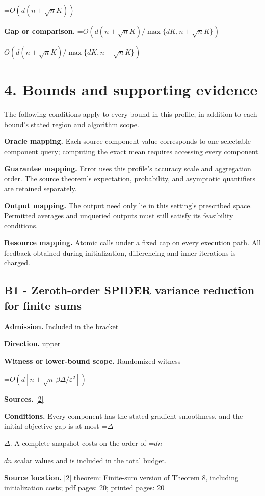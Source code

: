 \documentclass[10pt,a4paper]{article}
\newcommand{\AtlasMath}[1]{\par\begingroup\centering\setbox0=\hbox{$\displaystyle #1$}\ifdim\wd0>1.4\linewidth\typeout{ATLAS WIDE FORMULA: \the\wd0}\fi\ifdim\wd0>\linewidth\resizebox{\linewidth}{!}{\box0}\else\box0\fi\par\endgroup}
\newcommand{\AtlasInlineMath}[1]{\begingroup\setbox0=\hbox{$#1$}\ifdim\wd0>.4\linewidth\endgroup\AtlasMath{#1}\else\endgroup$#1$\fi}
\begin{document}
\AtlasMath{O(d(n+\sqrt n K))}
\textbf{Gap or comparison.} \AtlasInlineMath{O(d(n+\sqrt nK)/\max\{dK,n+\sqrt nK\})}

\section{4. Bounds and supporting evidence}
The following conditions apply to every bound in this profile, in addition to each bound's stated region and algorithm scope.

\textbf{Oracle mapping.} Each source component value corresponds to one selectable component query; computing the exact mean requires accessing every component.

\textbf{Guarantee mapping.} Error uses this profile's accuracy scale and aggregation order. The source theorem's expectation, probability, and asymptotic quantifiers are retained separately.

\textbf{Output mapping.} The output need only lie in this setting's prescribed space. Permitted averages and unqueried outputs must still satisfy its feasibility conditions.

\textbf{Resource mapping.} Atomic calls under a fixed cap on every execution path. All feedback obtained during initialization, differencing and inner iterations is charged.

\subsection{B1 - Zeroth-order SPIDER variance reduction for finite sums}
\textbf{Admission.} Included in the bracket

\textbf{Direction.} upper

\textbf{Witness or lower-bound scope.} Randomized witness

\AtlasMath{O\!\left(d[n+\sqrt n\,\beta \Delta/\varepsilon^2]\right)}
\textbf{Sources.} \href{https://arxiv.org/pdf/1807.01695}{[2]}

\textbf{Conditions.} Every component has the stated gradient smoothness, and the initial objective gap is at most \AtlasInlineMath{\Delta}. A complete snapshot costs on the order of \AtlasInlineMath{dn} scalar values and is included in the total budget.

\textbf{Source location.} \href{https://arxiv.org/pdf/1807.01695}{[2]} theorem: Finite-sum version of Theorem 8, including initialization costs; pdf pages: 20; printed pages: 20
\end{document}
